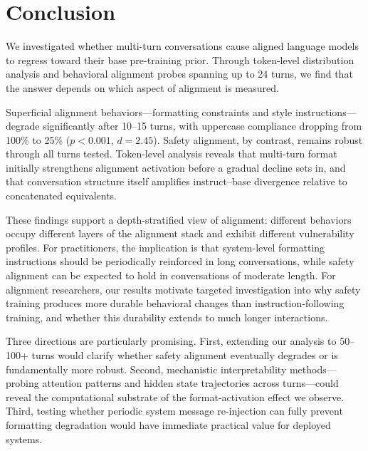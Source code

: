 \section{Conclusion}
\label{sec:conclusion}

We investigated whether multi-turn conversations cause aligned language models to regress toward their base pre-training prior. Through token-level distribution analysis and behavioral alignment probes spanning up to 24 turns, we find that the answer depends on which aspect of alignment is measured.

Superficial alignment behaviors---formatting constraints and style instructions---degrade significantly after 10--15 turns, with uppercase compliance dropping from 100\% to 25\% ($p < 0.001$, $d = 2.45$). Safety alignment, by contrast, remains robust through all turns tested. Token-level analysis reveals that multi-turn format initially strengthens alignment activation before a gradual decline sets in, and that conversation structure itself amplifies instruct--base divergence relative to concatenated equivalents.

These findings support a depth-stratified view of alignment: different behaviors occupy different layers of the alignment stack and exhibit different vulnerability profiles. For practitioners, the implication is that system-level formatting instructions should be periodically reinforced in long conversations, while safety alignment can be expected to hold in conversations of moderate length. For alignment researchers, our results motivate targeted investigation into why safety training produces more durable behavioral changes than instruction-following training, and whether this durability extends to much longer interactions.

 Three directions are particularly promising. First, extending our analysis to 50--100+ turns would clarify whether safety alignment eventually degrades or is fundamentally more robust. Second, mechanistic interpretability methods---probing attention patterns and hidden state trajectories across turns---could reveal the computational substrate of the format-activation effect we observe. Third, testing whether periodic system message re-injection can fully prevent formatting degradation would have immediate practical value for deployed systems.
